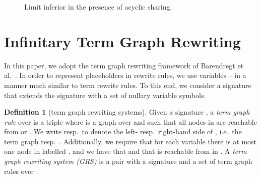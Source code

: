 \documentclass[copyright,creativecommons,UKenglish,final]{eptcs}
\theoremstyle{definition}
\newtheorem{definition}{Definition}[section]
\theoremstyle{plain}
\begin{document}
\begin{figure}
  \centering
  \caption{Limit inferior in the presence of acyclic sharing.}
  \label{fig:convWeird}
\end{figure}

\section{Infinitary Term Graph Rewriting}
\label{sec:infin-term-graph}

In this paper, we adopt the term graph rewriting framework of
Barendregt et al.~\cite{barendregt87parle}. In order to represent
placeholders in rewrite rules, we use variables -- in a manner much
similar to term rewrite rules. To this end, we consider a signature
 that extends the signature 
with a set  of nullary variable symbols.
\begin{definition}[term graph rewriting systems]
  Given a signature , a \emph{term graph rule}  over
   is a triple  where  is a graph over
   and  such that all nodes in  are
  reachable from  or . We write  resp.\  to
  denote the left- resp.\ right-hand side of , i.e.\ the term
  graph  resp.\ . Additionally, we
  require that for each variable  there is at most one node
   in  labelled , and we have that  and that  is
  reachable from  in .  A \emph{term graph rewriting system
    (GRS)}  is a pair  with  a signature
  and  a set of term graph rules over .
\end{definition}
\end{document}
